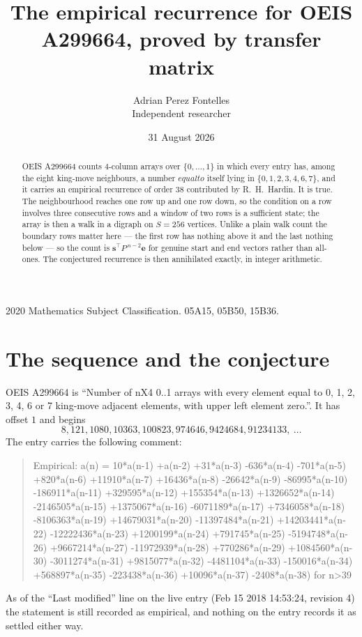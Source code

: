 \documentclass[11pt,a4paper]{article}
\title{The empirical recurrence for OEIS A299664, proved by transfer matrix}
\author{Adrian Perez Fontelles\\ \small Independent researcher}
\date{31 August 2026}
\theoremstyle{plain}
\theoremstyle{definition}
\begin{document}
\maketitle

\begin{abstract}
OEIS A299664 counts $4$-column arrays over $\{0,\dots,1\}$ in which every entry has,
among the eight king-move neighbours, a number $equal to$ itself lying in $\{0,1,2,3,4,6,7\}$, and it carries an empirical
recurrence of order $38$ contributed by R.~H.~Hardin. It is true. The neighbourhood
reaches one row up and one row down, so the condition on a row involves three consecutive
rows and a window of two rows is a sufficient state; the array is then a walk in a digraph
on $S=256$ vertices. Unlike a plain walk count the boundary rows matter here --- the first
row has nothing above it and the last nothing below --- so the count is
$\mathbf{s}^{\!\top}P^{\,n-2}\mathbf{e}$ for genuine start and end vectors rather than
all-ones. The conjectured recurrence is then annihilated exactly, in integer arithmetic.
\end{abstract}

\noindent\small 2020 Mathematics Subject Classification. 05A15, 05B50, 15B36.\normalsize

\section{The sequence and the conjecture}

OEIS A299664 is ``Number of nX4 0..1 arrays with every element equal to 0, 1, 2, 3, 4, 6 or 7 king-move adjacent elements, with upper left element zero.''. It has offset
$1$ and begins
\[
8, 121, 1080, 10363, 100823, 974646, 9424684, 91234133,\ \dots
\]
The entry carries the following comment:
\begin{quote}\small
Empirical: a(n) = 10*a(n-1) +a(n-2) +31*a(n-3) -636*a(n-4) -701*a(n-5) +820*a(n-6) +11910*a(n-7) +16436*a(n-8) -26642*a(n-9) -86995*a(n-10) -186911*a(n-11) +329595*a(n-12) +155354*a(n-13) +1326652*a(n-14) -2146505*a(n-15) +1375067*a(n-16) -6071189*a(n-17) +7346058*a(n-18) -8106363*a(n-19) +14679031*a(n-20) -11397484*a(n-21) +14203441*a(n-22) -12222436*a(n-23) +1200199*a(n-24) +791745*a(n-25) -5194748*a(n-26) +9667214*a(n-27) -11972939*a(n-28) +770286*a(n-29) +1084560*a(n-30) -3011274*a(n-31) +9815077*a(n-32) -4481104*a(n-33) -150016*a(n-34) +568897*a(n-35) -223438*a(n-36) +10096*a(n-37) -2408*a(n-38) for n>39
\end{quote}
As of the ``Last modified'' line on the live entry (Feb 15 2018 14:53:24, revision
4) the statement is still recorded as empirical, and nothing on the entry
records it as settled either way.
\end{document}
